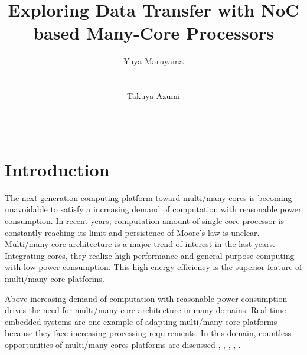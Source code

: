 \documentclass{sig-alternate-05-2015}
\author{
\alignauthor Yuya Maruyama\\
\affaddr{Graduate School of Engineering Science}\\
\affaddr{Osaka University}\\
\alignauthor Takuya Azumi\\
\affaddr{Graduate School of Engineering Science}\\
\affaddr{Osaka University}\\
}
\title{Exploring Data Transfer with NoC based Many-Core Processors}
\begin{document}

\maketitle

\setcounter{topnumber}{5}%
\def\topfraction{1.00}%
\setcounter{bottomnumber}{5}%
\def\bottomfraction{1.00}%
\setcounter{totalnumber}{10}%
\def\textfraction{0.00}%


\begin{abstract}
\end{abstract}



\section{Introduction}
The next generation computing platform toward multi/many cores is becoming unavoidable to satisfy a increasing demand of computation with reasonable power consumption.
In recent years, computation amount of single core processor is constantly reaching its limit and persistence of Moore's law \cite{moore2006cramming} is unclear.
Multi/many core architecture is a major trend of interest in the last years.
Integrating cores, they realize high-performance and general-purpose computing with low power consumption.
This high energy efficiency is the superior feature of multi/many core platforms.

Above increasing demand of computation with reasonable power consumption drives the need for multi/many core architecture in many domains.
Real-time embedded systems are one example of adapting multi/many core platforms because they face increasing processing requirements.
In this domain, countless opportunities of multi/many cores platforms are discussed \cite{becker2016contention}, \cite{saidi2015shift}, \cite{perret2016temporal}, \cite{perret2016mapping}, \cite{becker2014mapping}.
\end{document}
